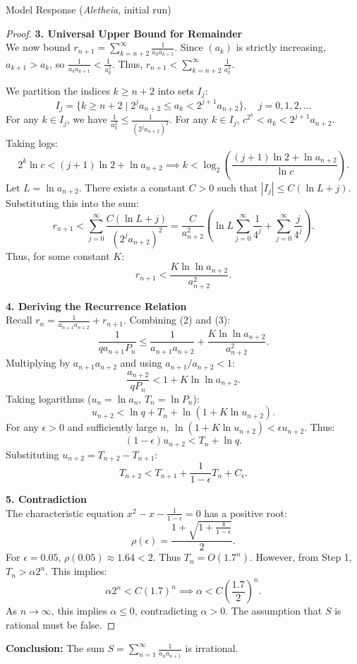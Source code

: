 \documentclass[11pt]{article}
\begin{document}
\begin{solution}{Model Response (\emph{Aletheia}, initial run)}
\begin{proof}
\vspace{1em}
\textbf{3. Universal Upper Bound for Remainder} \\
We now bound $r_{n+1} = \sum_{k=n+2}^\infty \frac{1}{a_k a_{k+1}}$.
Since $(a_k)$ is strictly increasing, $a_{k+1} > a_k$, so $\frac{1}{a_k a_{k+1}} < \frac{1}{a_k^2}$.
Thus, $r_{n+1} < \sum_{k=n+2}^\infty \frac{1}{a_k^2}$.

We partition the indices $k \ge n+2$ into sets $I_j$:
\[ I_j = \{ k \ge n+2 \mid 2^j a_{n+2} \le a_k < 2^{j+1} a_{n+2} \}, \quad j = 0, 1, 2, \dots \]
For any $k \in I_j$, we have $\frac{1}{a_k^2} \le \frac{1}{(2^j a_{n+2})^2}$. For any $k \in I_j$, $c^{2^k} < a_k < 2^{j+1} a_{n+2}$. Taking logs:
\[ 2^k \ln c < (j+1)\ln 2 + \ln a_{n+2} \implies k < \log_2 \left( \frac{(j+1)\ln 2 + \ln a_{n+2}}{\ln c} \right). \]
Let $L = \ln a_{n+2}$. There exists a constant $C > 0$ such that $|I_j| \le C (\ln L + j)$.
Substituting this into the sum:
\[ r_{n+1} < \sum_{j=0}^\infty \frac{C(\ln L + j)}{(2^j a_{n+2})^2} = \frac{C}{a_{n+2}^2} \left( \ln L \sum_{j=0}^\infty \frac{1}{4^j} + \sum_{j=0}^\infty \frac{j}{4^j} \right). \]
Thus, for some constant $K$:
\begin{equation}
r_{n+1} < \frac{K \ln \ln a_{n+2}}{a_{n+2}^2}.
\end{equation}

\vspace{1em}
\textbf{4. Deriving the Recurrence Relation} \\
Recall $r_n = \frac{1}{a_{n+1} a_{n+2}} + r_{n+1}$. Combining (2) and (3):
\[ \frac{1}{q a_{n+1} P_n} \le \frac{1}{a_{n+1} a_{n+2}} + \frac{K \ln \ln a_{n+2}}{a_{n+2}^2}. \]
Multiplying by $a_{n+1} a_{n+2}$ and using $a_{n+1}/a_{n+2} < 1$:
\[ \frac{a_{n+2}}{q P_n} < 1 + K \ln \ln a_{n+2}. \]
Taking logarithms ($u_n = \ln a_n$, $T_n = \ln P_n$):
\[ u_{n+2} < \ln q + T_n + \ln(1 + K \ln u_{n+2}). \]
For any $\epsilon > 0$ and sufficiently large $n$, $\ln(1 + K \ln u_{n+2}) < \epsilon u_{n+2}$. Thus:
\[ (1 - \epsilon) u_{n+2} < T_n + \ln q. \]
Substituting $u_{n+2} = T_{n+2} - T_{n+1}$:
\[ T_{n+2} < T_{n+1} + \frac{1}{1-\epsilon} T_n + C_\epsilon. \]

\vspace{1em}
\textbf{5. Contradiction} \\
The characteristic equation $x^2 - x - \frac{1}{1-\epsilon} = 0$ has a positive root:
\[ \rho(\epsilon) = \frac{1 + \sqrt{1 + \frac{4}{1-\epsilon}}}{2}. \]
For $\epsilon = 0.05$, $\rho(0.05) \approx 1.64 < 2$. Thus $T_n = O(1.7^n)$.
However, from Step 1, $T_n > \alpha 2^n$. This implies:
\[ \alpha 2^n < C (1.7)^n \implies \alpha < C \left( \frac{1.7}{2} \right)^n. \]
As $n \to \infty$, this implies $\alpha \le 0$, contradicting $\alpha > 0$.
The assumption that $S$ is rational must be false.
\end{proof}

\textbf{Conclusion:} The sum $S = \sum_{n=1}^\infty \frac{1}{a_n a_{n+1}}$ is irrational.

\end{solution}
\end{document}
